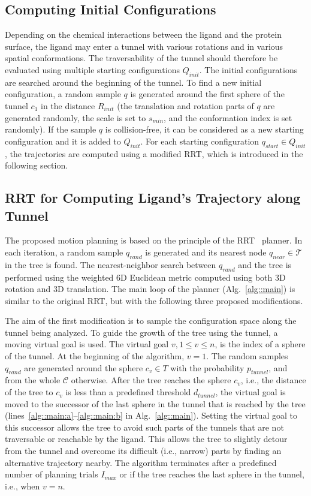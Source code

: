 \documentclass[usletter, 10pt, conference]{ieeeconf} %
\def\qrand{q_{rand}}
\def\qstart{q_{start}}
\def\qinit{\qstart}
\def\qgoal{q_{goal}}
\def\qnear{q_{near}}
\def\T{\mathcal{T}}
\def\C{\mathcal{C}}
\def\dt{d_{tunnel}}
\def\QI{Q_{init}}
\def\RI{R_{init}}
\def\Imax{I_{max}} %
\def\smin{s_{min}}
\def\gb{p_{tunnel}}
\begin{document}
\subsection{Computing Initial Configurations}

Depending on the chemical interactions between the ligand and the protein surface, the ligand may enter a tunnel with various rotations and in various spatial conformations.
The traversability of the tunnel should therefore be evaluated using multiple starting configurations $\QI$.
The initial configurations are searched around the beginning of the tunnel.
To find a new initial configuration, a random sample $q$ is generated around the first sphere of the tunnel 
$c_1$ in the distance $\RI$ (the translation and rotation parts of $q$ are generated randomly, the scale is set to $\smin$, and the conformation index is set randomly).
If the sample $q$ is collision-free, it can be considered as a new starting configuration and it is added to $\QI$.
For each starting configuration $\qinit \in \QI$, the trajectories are computed using a modified RRT, which is introduced in the following section.


\subsection{RRT for Computing Ligand's Trajectory along Tunnel}

The proposed motion planning is based on the principle of the RRT~\cite{lavalleRRT} planner.
In each iteration, a random sample $\qrand$ is generated and its nearest node $\qnear\in\T$ in the tree is found.
The nearest-neighbor search between $\qrand$ and the tree is performed using the weighted 6D Euclidean metric computed using
both 3D rotation and 3D translation.
The main loop of the planner (Alg.~\ref{alg::main}) is similar to the original RRT, but with the following three proposed modifications.

The aim of the first modification is to sample the configuration space along the tunnel being analyzed.
To guide the growth of the tree using the tunnel, a moving virtual goal is used. %
The virtual goal $v, 1\le v \le n$, is the index of a sphere of the tunnel.
At the beginning of the algorithm, $v=1$.
The random samples $\qrand$ are generated around the sphere $c_v \in T$ with the probability $\gb$, and from the whole $\C$ otherwise.
After the tree reaches the sphere $c_v$, i.e., the distance of the tree to $c_v$ is
less than a predefined threshold $\dt$, the virtual goal is moved to the successor of the last sphere in the tunnel
that is reached by the tree (lines~\ref{alg::main:a}--\ref{alg::main:b} in Alg.~\ref{alg::main}).
Setting the virtual goal to this successor allows the tree to avoid such parts of the tunnels that are not traversable or reachable by the ligand.
This allows the tree to slightly detour from the tunnel and overcome its difficult (i.e., narrow) parts by finding an alternative trajectory nearby.
The algorithm terminates after a predefined number of planning trials $\Imax$ or if the tree reaches
the last sphere in the tunnel, i.e., when $v = n$.
\end{document}
